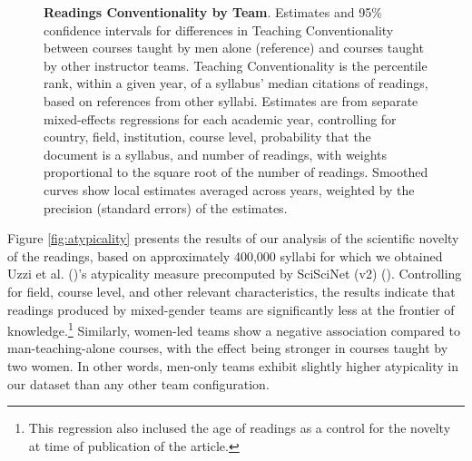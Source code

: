 \documentclass[
  british,
  12pt, %
]{article}
\providecommand{\DIFaddendFL}{} %
\DeclareRobustCommand{\DIFaddendFL}{\DIFOaddendFL \let\includegraphics\DIFOincludegraphics} %
\begin{document}
\begin{figure}
\DIFaddendFL \caption{\label{fig:conventionality}\textbf{Readings Conventionality by Team}. Estimates and 95\% confidence intervals for differences in Teaching Conventionality between courses taught by men alone (reference) and courses taught by other instructor teams. Teaching Conventionality is the percentile rank, within a given year, of a syllabus' median citations of readings, based on references from other syllabi. Estimates are from separate mixed-effects regressions for each academic year, controlling for country, field, institution, course level, probability that the document is a syllabus, and number of readings, with weights proportional to the square root of the number of readings. Smoothed curves show local estimates averaged across years, weighted by the precision (standard errors) of the estimates.}
\end{figure}

Figure \ref{fig:atypicality} presents the results of our analysis of the scientific novelty of the readings, based on approximately 400,000 syllabi for which we obtained Uzzi et al. ()'s atypicality measure precomputed by SciSciNet (v2) (). Controlling for field, course level, and other relevant characteristics, the results indicate that readings produced by mixed-gender teams are significantly less at the frontier of knowledge.\footnote{
  This regression also inclused the age of readings as a control for the novelty at time of publication of the article.} Similarly, women-led teams show a negative association compared to man-teaching-alone courses, with the effect being stronger in courses taught by two women. In other words, men-only teams exhibit slightly higher atypicality in our dataset than any other team configuration.
\end{document}
